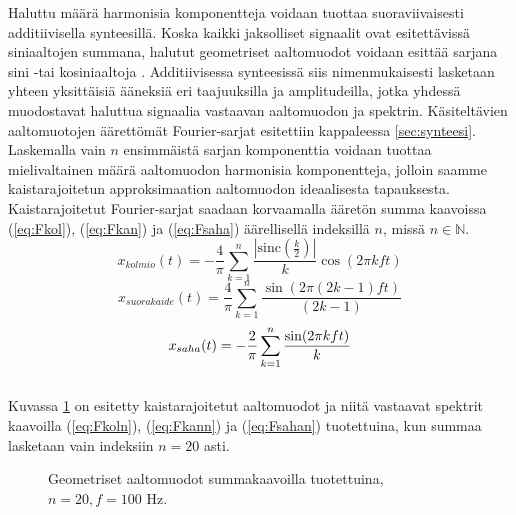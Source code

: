 \documentclass[finnish,12pt,a4paper,pdftex]{article} %
\begin{document}
Haluttu määrä harmonisia komponentteja voidaan tuottaa suoraviivaisesti additiivisella synteesillä. Koska kaikki jaksolliset signaalit ovat esitettävissä siniaaltojen summana, halutut geometriset aaltomuodot voidaan esittää sarjana sini -tai kosiniaaltoja \cite{Sound}. Additiivisessa synteesissä siis nimenmukaisesti lasketaan yhteen yksittäisiä ääneksiä eri taajuuksilla ja amplitudeilla, jotka yhdessä muodostavat haluttua signaalia vastaavan aaltomuodon ja spektrin. Käsiteltävien aaltomuotojen äärettömät Fourier-sarjat esitettiin kappaleessa \ref{sec:synteesi}. Laskemalla vain $n$ ensimmäistä sarjan komponenttia voidaan tuottaa mielivaltainen määrä aaltomuodon harmonisia komponentteja, jolloin saamme kaistarajoitetun approksimaation aaltomuodon ideaalisesta tapauksesta. Kaistarajoitetut Fourier-sarjat saadaan korvaamalla ääretön summa kaavoissa (\ref{eq:Fkol}), (\ref{eq:Fkan}) ja (\ref{eq:Fsaha}) äärellisellä indeksillä $n$, missä $n \in \mathbb{N}$.
\begin{equation} \label{eq:Fkoln}
x_{kolmio}(t) = -\frac{4}{\pi}\sum_{k=1}^{n}\frac{|\textrm{sinc}(\frac{k}{2})|}{k} \cos(2 \pi k f t)
\end{equation}
\vspace{1mm}
\begin{equation} \label{eq:Fkann}
x_{suorakaide}(t) = \frac{4}{\pi}\sum_{k=1}^{n}\frac{\sin(2 \pi (2k-1) f t)}{(2k-1)}
\end{equation}
\vspace{1mm}
\begin{equation} \label{eq:Fsahan}
x_{saha}(t) = -\frac{2}{\pi}\sum_{k=1}^{n}\frac{\sin(2 \pi k f t)}{k} \vspace{1mm}
\end{equation} \\
Kuvassa \ref{fig:sarjat} on esitetty kaistarajoitetut aaltomuodot ja niitä vastaavat spektrit kaavoilla (\ref{eq:Fkoln}), (\ref{eq:Fkann}) ja (\ref{eq:Fsahan}) tuotettuina, kun summaa lasketaan vain indeksiin $n = 20$ asti.
\vspace{1mm}
\begin{figure}[h] 
\begin{center} 
\newcommand{\figsize}{71mm}
\caption{Geometriset aaltomuodot summakaavoilla tuotettuina, $n = 20, f = 100$ Hz.}
\label{fig:sarjat}
\end{center}
\end{figure} \\
\end{document}
